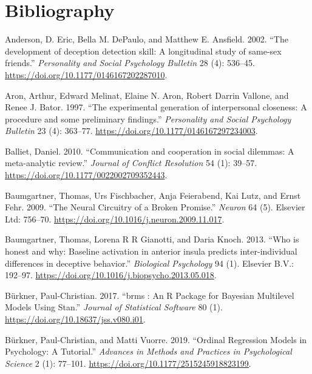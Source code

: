 \documentclass[smallextended]{svjour3}       %
\begin{document}
\hypertarget{bibliography}{%
\section*{Bibliography}\label{bibliography}}

\hypertarget{refs}{}
\leavevmode\hypertarget{ref-Anderson2002}{}%
Anderson, D. Eric, Bella M. DePaulo, and Matthew E. Ansfield. 2002.
``The development of deception detection skill: A longitudinal study of
same-sex friends.'' \emph{Personality and Social Psychology Bulletin} 28
(4): 536--45. \url{https://doi.org/10.1177/0146167202287010}.

\leavevmode\hypertarget{ref-Aron1997}{}%
Aron, Arthur, Edward Melinat, Elaine N. Aron, Robert Darrin Vallone, and
Renee J. Bator. 1997. ``The experimental generation of interpersonal
closeness: A procedure and some preliminary findings.''
\emph{Personality and Social Psychology Bulletin} 23 (4): 363--77.
\url{https://doi.org/10.1177/0146167297234003}.

\leavevmode\hypertarget{ref-Balliet2010}{}%
Balliet, Daniel. 2010. ``Communication and cooperation in social
dilemmas: A meta-analytic review.'' \emph{Journal of Conflict
Resolution} 54 (1): 39--57.
\url{https://doi.org/10.1177/0022002709352443}.

\leavevmode\hypertarget{ref-Baumgartner2009}{}%
Baumgartner, Thomas, Urs Fischbacher, Anja Feierabend, Kai Lutz, and
Ernst Fehr. 2009. ``The Neural Circuitry of a Broken Promise.''
\emph{Neuron} 64 (5). Elsevier Ltd: 756--70.
\url{https://doi.org/10.1016/j.neuron.2009.11.017}.

\leavevmode\hypertarget{ref-Baumgartner2013}{}%
Baumgartner, Thomas, Lorena R R Gianotti, and Daria Knoch. 2013. ``Who
is honest and why: Baseline activation in anterior insula predicts
inter-individual differences in deceptive behavior.'' \emph{Biological
Psychology} 94 (1). Elsevier B.V.: 192--97.
\url{https://doi.org/10.1016/j.biopsycho.2013.05.018}.

\leavevmode\hypertarget{ref-Burkner2017}{}%
Bürkner, Paul-Christian. 2017. ``brms : An R Package for Bayesian
Multilevel Models Using Stan.'' \emph{Journal of Statistical Software}
80 (1). \url{https://doi.org/10.18637/jss.v080.i01}.

\leavevmode\hypertarget{ref-Burkner2019}{}%
Bürkner, Paul-Christian, and Matti Vuorre. 2019. ``Ordinal Regression
Models in Psychology: A Tutorial.'' \emph{Advances in Methods and
Practices in Psychological Science} 2 (1): 77--101.
\url{https://doi.org/10.1177/2515245918823199}.
\end{document}
